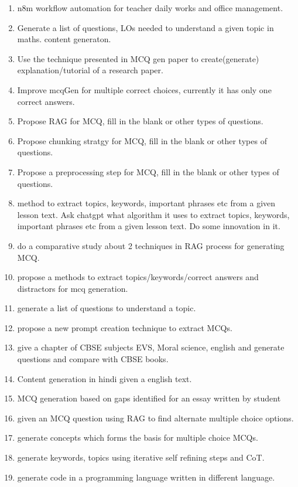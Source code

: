 \begin{enumerate}
        \item n8m workflow automation for teacher daily works and office management.  
        \item Generate a list of questions, LOs needed to understand a given topic in maths. content generaton. 
        \item Use the technique presented in MCQ gen paper to create(generate) explanation/tutorial of a research paper. 
        \item Improve mcqGen for multiple correct choices, currently it has only one correct answers.
        \item Propose RAG for MCQ, fill in the blank or other types of questions.
        \item Propose chunking stratgy for  MCQ, fill in the blank or other types of questions.
        \item Propose  a preprocessing step for MCQ, fill in the blank or other types of questions.
        \item method to extract topics, keywords, important phrases etc from a given lesson text. Ask chatgpt what algorithm it uses to extract topics, keywords, important phrases etc from a given lesson text. Do some innovation in it.
        \item do a comparative study about 2 techniques in RAG process for generating MCQ.
        \item propose  a methods to extract topics/keywords/correct answers and distractors for mcq generation.
        \item  generate a list of questions to understand a topic.
        \item propose a new prompt creation technique to extract MCQs.
        \item give a chapter of CBSE subjects EVS, Moral science, english and generate questions and compare with CBSE books.
        \item Content generation in hindi given a english text.
        \item MCQ generation based on gaps identified for an essay written by student
        \item given an MCQ question using RAG to find alternate multiple choice options.
        \item generate concepts which forms the basis for multiple choice MCQs.
        \item generate keywords, topics using iterative self refining steps and CoT. 
        \item generate code in a programming language written in different language.

\end{enumerate}
